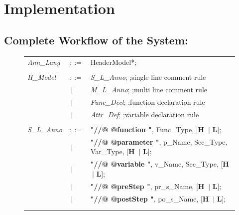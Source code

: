 \chapter{Implementation}

\section{Complete Workflow of the System:}

\begin{figure}[ht!]
	\begin{tabular}{lll}
		\footnotesize                       
		\textit{Ann\_Lang}           &\footnotesize $::=$         &\footnotesize HeaderModel*;       \\ \\
		
		\footnotesize
		\textit{H\_Model}            &\footnotesize $::=$         &\footnotesize \textit{S\_L\_Anno};       \hfill ;single line comment rule   \\     
		&\footnotesize $\ \vert $    &\footnotesize \textit{M\_L\_Anno};       \hfill ;multi line comment rule    \\ 
		&\footnotesize $\ \vert $    &\footnotesize \textit{Func\_Decl};       \hfill ;function declaration rule  \\ 
		&\footnotesize $\ \vert $    &\footnotesize \textit{Attr\_Def};        \hfill ;variable declaration rule  \\ \\
		\footnotesize  	
		\textit{S\_L\_Anno}          &\footnotesize $::=$         &\footnotesize \textbf{"//@ @function "},    Func\_Type,              [\textbf{H} $\ \vert $  \textbf{L}];     \\
		&\footnotesize $\ \vert $    &\footnotesize \textbf{"//@ @parameter "},   p\_Name,  Sec\_Type, Var\_Type,    [\textbf{H} $\ \vert $  \textbf{L}];    \\
		&\footnotesize $\ \vert $    &\footnotesize \textbf{"//@ @variable "},    v\_Name,  Sec\_Type,     [\textbf{H} $\ \vert $  \textbf{L}];    \\
		&\footnotesize $\ \vert $    &\footnotesize \textbf{"//@ @preStep "},     pr\_s\_Name,             [\textbf{H} $\ \vert $  \textbf{L}];    \\
		&\footnotesize $\ \vert $    &\footnotesize \textbf{"//@ @postStep "},    po\_s\_Name,             [\textbf{H} $\ \vert $  \textbf{L}];    \\ \\   
		\footnotesize            

\end{tabular}
\end{figure}
